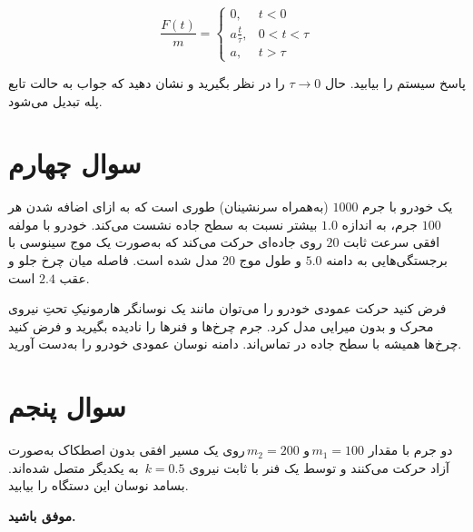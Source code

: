 \documentclass[a4paper,16pt]{article}
\begin{document}
\[
\frac{F(t)}{m} =
\begin{cases}
	0, & t<0\\[2mm]
	a \frac{t}{\tau}, & 0<t<\tau\\[1mm]
	a, & t>\tau
\end{cases}
\]

پاسخ سیستم  را بیابید. حال \(\tau \to 0\) را در نظر بگیرید و نشان دهید که جواب به حالت تابع پله  تبدیل می‌شود.


\section{سوال چهارم}
یک خودرو با جرم \(1000\)  (به‌همراه سرنشینان) طوری است که به ازای اضافه شدن هر \(100\)  جرم، به اندازه \(1.0\)  بیشتر نسبت به سطح جاده نشست می‌کند.  
خودرو با مولفه افقی سرعت ثابت \(20\)  روی جاده‌ای حرکت می‌کند که به‌صورت یک موج سینوسی با برجستگی‌هایی به دامنه \(5.0\)  و طول موج \(20\)  مدل شده است. فاصله میان چرخ جلو و عقب \(2.4\)  است.

فرض کنید حرکت عمودی خودرو را می‌توان مانند یک نوسانگر هارمونیکِ تحتِ نیروی محرک و بدون میرایی مدل کرد. جرم چرخ‌ها و فنرها را نادیده بگیرید و فرض کنید چرخ‌ها همیشه با سطح جاده در تماس‌اند.  
دامنه نوسان عمودی خودرو را به‌دست آورید.


\section{سوال پنجم}
دو جرم با مقدار  \(m_1 = 100\)\,و  \(m_2 = 200\)\,روی یک مسیر افقی بدون اصطکاک به‌صورت آزاد حرکت می‌کنند و توسط یک فنر با ثابت نیروی \(k = 0.5\)\, به یکدیگر متصل شده‌اند. بسامد نوسان این دستگاه را بیابید.


	
	\vspace{10pt}
\textbf{موفق باشید.}
\end{document}
